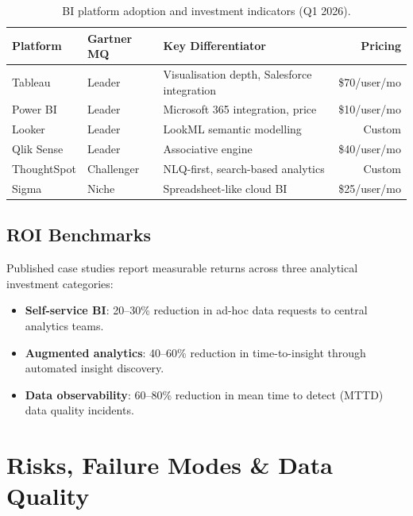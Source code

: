 \documentclass[12pt, a4paper]{article}
\begin{document}
\begin{table}[ht]
\centering
\caption{BI platform adoption and investment indicators (Q1 2026).}
\label{tab:bi-market}
\begin{tabular}{l l >{\raggedright\arraybackslash}p{5.0cm} r}
\toprule
\textbf{Platform} & \textbf{Gartner MQ} & \textbf{Key Differentiator} & \textbf{Pricing} \\
\midrule
Tableau       & Leader     & Visualisation depth, Salesforce integration & \$70/user/mo \\
Power BI      & Leader     & Microsoft 365 integration, price    & \$10/user/mo \\
Looker        & Leader     & LookML semantic modelling           & Custom \\
Qlik Sense    & Leader     & Associative engine                  & \$40/user/mo \\
ThoughtSpot   & Challenger & NLQ-first, search-based analytics   & Custom \\
Sigma         & Niche      & Spreadsheet-like cloud BI           & \$25/user/mo \\
\bottomrule
\end{tabular}
\end{table}

\subsection{ROI Benchmarks}
Published case studies report measurable returns across three analytical investment categories:

\begin{itemize}
    \item \textbf{Self-service BI}: 20--30\% reduction in ad-hoc data requests to central analytics teams.
    \item \textbf{Augmented analytics}: 40--60\% reduction in time-to-insight through automated insight discovery.
    \item \textbf{Data observability}: 60--80\% reduction in mean time to detect (MTTD) data quality incidents.
\end{itemize}

\section{Risks, Failure Modes \& Data Quality}\label{sec:risks}
\end{document}
